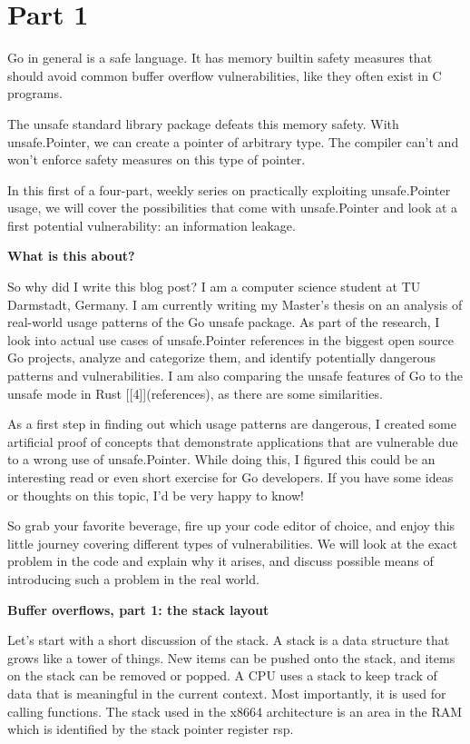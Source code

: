 
\section{Part 1}

Go in general is a safe language. It has memory builtin safety measures that should avoid common buffer overflow
vulnerabilities, like they often exist in C programs.

The unsafe standard library package defeats this memory safety. With unsafe.Pointer, we can create a pointer of
arbitrary type. The compiler can't and won't enforce safety measures on this type of pointer.

In this first of a four-part, weekly series on practically exploiting unsafe.Pointer usage, we will cover the possibilities
that come with unsafe.Pointer and look at a first potential vulnerability: an information leakage.


\textbf{What is this about?}

So why did I write this blog post? I am a computer science student at TU Darmstadt, Germany. I am currently writing my
Master's thesis on an analysis of real-world usage patterns of the Go unsafe package. As part of the research, I look
into actual use cases of unsafe.Pointer references in the biggest open source Go projects, analyze and categorize them,
and identify potentially dangerous patterns and vulnerabilities. I am also comparing the unsafe features of Go to the
unsafe mode in Rust [[4]](references), as there are some similarities.

As a first step in finding out which usage patterns are dangerous, I created some artificial proof of concepts that
demonstrate applications that are vulnerable due to a wrong use of unsafe.Pointer. While doing this, I figured this
could be an interesting read or even short exercise for Go developers. If you have some ideas or thoughts on this topic,
I'd be very happy to know!

So grab your favorite beverage, fire up your code editor of choice, and enjoy this little journey covering different
types of vulnerabilities. We will look at the exact problem in the code and explain why it arises, and discuss possible
means of introducing such a problem in the real world.


\textbf{Buffer overflows, part 1: the stack layout }

Let's start with a short discussion of the stack. A stack is a data structure that grows like a tower of things. New
items can be pushed onto the stack, and items on the stack can be removed or popped. A CPU uses a stack to keep track
of data that is meaningful in the current context. Most importantly, it is used for calling functions. The stack used
in the x8664 architecture is an area in the RAM which is identified by the stack pointer register rsp.

